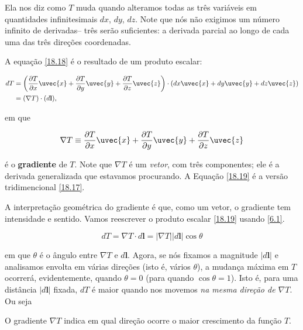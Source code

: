 Ela nos diz como $T$ muda quando alteramos todas as três variáveis em quantidades infinitesimais $dx$, $dy$, $dz$. Note que nós não exigimos um número infinito de derivadas-- três serão suficientes: a derivada parcial ao longo de cada uma das três direções coordenadas.

A equação \eqref{18.18} é o resultado de um produto escalar:

\begin{equation}\label{18.20}
\begin{split}
    dT&=\left( \dfrac{\partial T}{\partial x} \uvec{x}+\dfrac{\partial T}{\partial y} \uvec{y}+\dfrac{\partial T}{\partial z} \uvec{z} \right) \cdot (dx \uvec{x}+dy \uvec{y}+dz \uvec{z})\\
    &=(\nabla  T)\cdot (d\textbf{l}),
\end{split}
\end{equation}

em que 

\begin{equation}\label{18.21}
    \nabla  T \equiv \dfrac{\partial T}{\partial x} \uvec{x}+\dfrac{\partial T}{\partial y} \uvec{y}+\dfrac{\partial T}{\partial z} \uvec{z}
\end{equation}

é o \textbf{gradiente} de $T$. Note que $\nabla  T$ é um \textit{vetor}, com três componentes; ele é a derivada generalizada que estavamos procurando. A Equação \eqref{18.19} é a versão tridimencional \eqref{18.17}.

A interpretação geométrica do gradiente é que, como um vetor, o gradiente tem intensidade e sentido. Vamos reescrever o produto escalar \eqref{18.19} usando \eqref{6.1}.

\begin{equation}\label{18.22}
    dT= \nabla  T \cdot d\textbf{l} = |\nabla  T| |d\textbf{l}| \cos \theta
\end{equation}

em que $\theta$ é o ângulo entre $\nabla  T$ e $d\textbf{l}$. Agora, se nós fixamos a magnitude $|d\textbf{l}|$ e analisamos envolta em várias direções (isto é, vários $\theta$), a mudança máxima em $T$ ocorrerá, evidentemente, quando $\theta=0$ (para quando $\cos \theta=1$). Isto é, para uma distância $|d\textbf{l}|$ fixada, $dT$ é maior quando nos movemos \textit{na mesma direção de $\nabla  T$}. Ou seja

\begin{teo}
O gradiente $\nabla  T$ indica em qual direção ocorre o maior crescimento da função $T$.
\end{teo}

